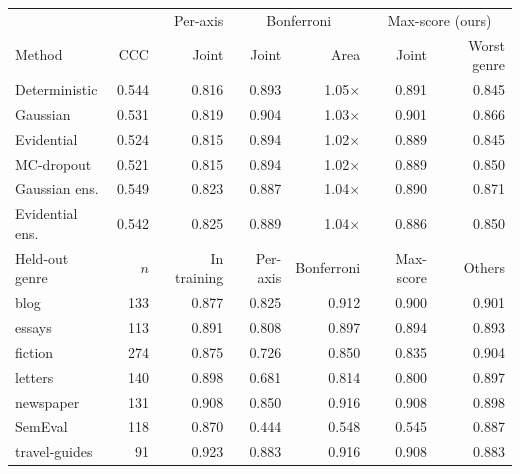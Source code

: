 \begin{tabular}{lrrrrrr}
\toprule
 & & Per-axis & \multicolumn{2}{c}{Bonferroni} & \multicolumn{2}{c}{Max-score (ours)} \\
Method & CCC & Joint & Joint & Area & Joint & Worst genre \\
\midrule
Deterministic & 0.544 & 0.816 & 0.893 & 1.05$\times$ & 0.891 & 0.845 \\
Gaussian & 0.531 & 0.819 & 0.904 & 1.03$\times$ & 0.901 & 0.866 \\
Evidential & 0.524 & 0.815 & 0.894 & 1.02$\times$ & 0.889 & 0.845 \\
MC-dropout & 0.521 & 0.815 & 0.894 & 1.02$\times$ & 0.889 & 0.850 \\
Gaussian ens. & 0.549 & 0.823 & 0.887 & 1.04$\times$ & 0.890 & 0.871 \\
Evidential ens. & 0.542 & 0.825 & 0.889 & 1.04$\times$ & 0.886 & 0.850 \\
\midrule
Held-out genre & $n$ & In training & Per-axis & Bonferroni & Max-score & Others \\
\midrule
blog & 133 & 0.877 & 0.825 & 0.912 & 0.900 & 0.901 \\
essays & 113 & 0.891 & 0.808 & 0.897 & 0.894 & 0.893 \\
fiction & 274 & 0.875 & 0.726 & 0.850 & 0.835 & 0.904 \\
letters & 140 & 0.898 & 0.681 & 0.814 & 0.800 & 0.897 \\
newspaper & 131 & 0.908 & 0.850 & 0.916 & 0.908 & 0.898 \\
SemEval & 118 & 0.870 & 0.444 & 0.548 & 0.545 & 0.887 \\
travel-guides & 91 & 0.923 & 0.883 & 0.916 & 0.908 & 0.883 \\
\bottomrule
\end{tabular}
